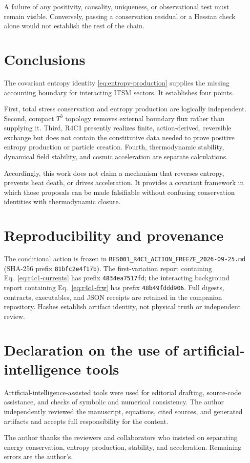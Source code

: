 \documentclass[aps,prd,reprint,superscriptaddress,nofootinbib,floatfix]{revtex4-2}
\newcommand{\Tthree}{T^{3}}
\begin{document}
A failure of any positivity, causality, uniqueness, or observational test must
remain visible.  Conversely, passing a conservation residual or a Hessian
check alone would not establish the rest of the chain.

\section{Conclusions}
\label{sec:conclusions}

The covariant entropy identity
\eqref{eq:entropy-production} supplies the missing accounting boundary for
interacting ITSM sectors.  It establishes four points.

First, total stress conservation and entropy production are logically
independent.  Second, compact \(\Tthree\) topology removes external boundary
flux rather than supplying it.  Third, R4C1 presently realizes finite,
action-derived, reversible exchange but does not contain the constitutive data
needed to prove positive entropy production or particle creation.  Fourth,
thermodynamic stability, dynamical field stability, and cosmic acceleration
are separate calculations.

Accordingly, this work does not claim a mechanism that reverses entropy,
prevents heat death, or drives acceleration.  It provides a covariant
framework in which those proposals can be made falsifiable without confusing
conservation identities with thermodynamic closure.

\section*{Reproducibility and provenance}

The conditional action is frozen in
\texttt{RES001\_R4C1\_ACTION\_FREEZE\_2026-09-25.md}
(SHA-256 prefix \texttt{81bfc2e4f17b}).  The first-variation report containing
Eq.~\eqref{eq:r4c1-currents} has prefix \texttt{4834ea7517fd}; the interacting
background report containing Eq.~\eqref{eq:r4c1-frw} has prefix
\texttt{48b49fddd906}.  Full digests, contracts, executables, and JSON receipts
are retained in the companion repository.  Hashes establish artifact identity,
not physical truth or independent review.

\section*{Declaration on the use of artificial-intelligence tools}

Artificial-intelligence-assisted tools were used for editorial drafting,
source-code assistance, and checks of symbolic and numerical consistency.
The author independently reviewed the manuscript, equations, cited sources,
and generated artifacts and accepts full responsibility for the content.

\begin{acknowledgments}
The author thanks the reviewers and collaborators who insisted on separating
energy conservation, entropy production, stability, and acceleration.
Remaining errors are the author's.
\end{acknowledgments}


\end{document}
